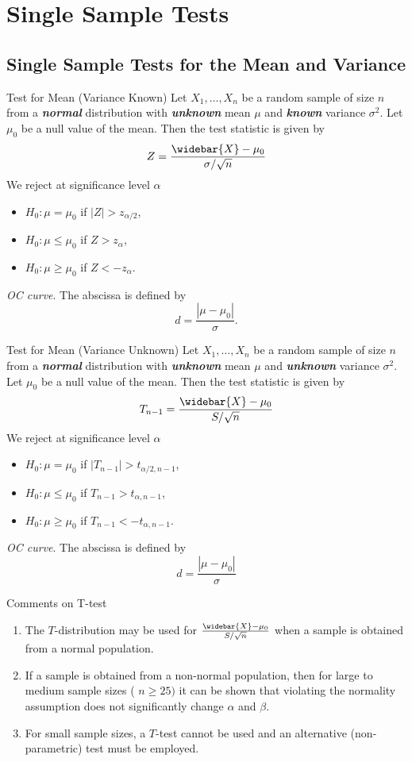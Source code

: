 \documentclass{beamer}
\newcommand{\bb}[1]{\textcolor{antiquefuchsia}{\textbf{\textit{#1}}}}
\begin{document}
\section{Single Sample Tests}
\subsection{Single Sample Tests for the Mean and Variance}
\begin{frame}{Test for Mean (Variance Known)}
Let $X_{1}, \ldots, X_{n}$ be a random sample of size $n$ from a \bb{normal} distribution with \bb{unknown} mean $\mu$ and \bb{known} variance $\sigma^{2}$. Let $\mu_{0}$ be a null value of the mean. Then the test statistic is given by
$$
Z=\frac{\widebar{X}-\mu_{0}}{\sigma / \sqrt{n}}
$$
We reject at significance level $\alpha$
\begin{itemize}
\item $H_{0}: \mu=\mu_{0}$ if $|Z|>z_{\alpha / 2}$,
\item $H_{0}: \mu \leq \mu_{0}$ if $Z>z_{\alpha}$,
\item $H_{0}: \mu \geq \mu_{0}$ if $Z<-z_{\alpha}$.
\end{itemize}
\textit{OC curve}. The abscissa is defined by
$$
d=\frac{\left|\mu-\mu_{0}\right|}{\sigma} .
$$
\end{frame}


\begin{frame}{Test for Mean (Variance Unknown)}
Let $X_{1}, \ldots, X_{n}$ be a random sample of size $n$ from a \bb{normal} distribution with \bb{unknown} mean $\mu$ and \bb{unknown} variance $\sigma^{2}$. Let $\mu_{0}$ be a null value of the mean. Then the test statistic is given by
$$
T_{n-1}=\frac{\widebar{X}-\mu_{0}}{S / \sqrt{n}}
$$
We reject at significance level $\alpha$
\begin{itemize}
\item $H_{0}: \mu=\mu_{0}$ if $\left|T_{n-1}\right|>t_{\alpha / 2, n-1}$,
\item $H_{0}: \mu \leq \mu_{0}$ if $T_{n-1}>t_{\alpha, n-1}$,
\item $H_{0}: \mu \geq \mu_{0}$ if $T_{n-1}<-t_{\alpha, n-1}$.
\end{itemize}
\textit{OC curve}. The abscissa is defined by
$$
d=\frac{\left|\mu-\mu_{0}\right|}{\sigma}
$$
\end{frame}

\begin{frame}{Comments on T-test}
\begin{enumerate}
\item The $T$-distribution may be used for $\frac{\widebar{X}-\mu_{0}}{S / \sqrt{n}}$ when a sample is obtained from a normal population.
\item If a sample is obtained from a non-normal population, then for large to medium sample sizes ( $n \geq 25)$ it can be shown that violating the normality assumption does not significantly change $\alpha$ and $\beta$.
\item For small sample sizes, a $T$-test cannot be used and an alternative (non-parametric) test must be employed.
\end{enumerate}
\end{frame}
\end{document}

